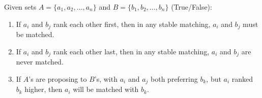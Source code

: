 \newpage 

\noindent


\begin{Exercise}Given sets $A=\{a_1,a_2,\dots,a_n\}$ and $B=\{b_1,b_2,\dots,b_n\}$ (True/False):
    \begin{enumerate}
        \item If $a_i$ and $b_j$ rank each other first, then in any stable matching, $a_i$ and $b_j$ must be matched.
        \item If $a_i$ and $b_j$ rank each other last, then in any stable matching, $a_i$ and $b_j$ are never matched.
        \item If $A$'s are proposing to $B$'s, with $a_i$ and $a_j$ both preferring $b_k$, but $a_i$ ranked $b_k$ higher, then $a_i$ will be matched with $b_k$.
    \end{enumerate}
    

\end{Exercise}


